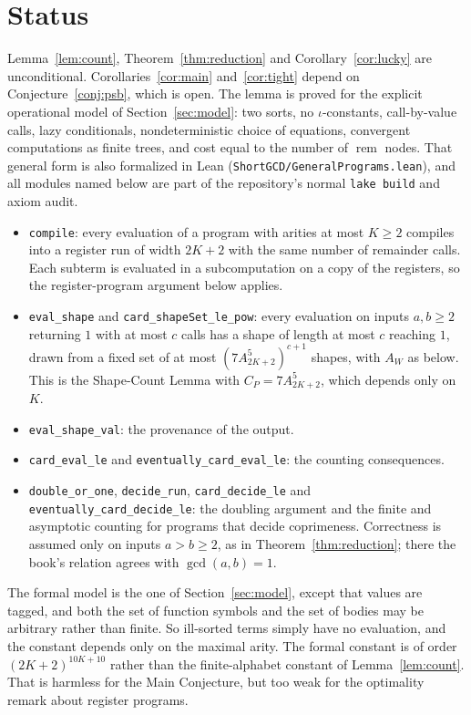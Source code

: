 \documentclass[11pt]{article}
\theoremstyle{remark}
\newcommand{\rem}{\operatorname{rem}}
\begin{document}
\section{Status}
Lemma~\ref{lem:count}, Theorem~\ref{thm:reduction} and
Corollary~\ref{cor:lucky} are unconditional. Corollaries~\ref{cor:main}
and~\ref{cor:tight} depend on Conjecture~\ref{conj:psb}, which is open.
The lemma is proved for the explicit operational model of
Section~\ref{sec:model}: two sorts, no $\iota$-constants, call-by-value calls,
lazy conditionals, nondeterministic choice of equations, convergent
computations as finite trees, and cost equal to the number of $\rem$ nodes.
That general form is also formalized in Lean
(\texttt{ShortGCD/GeneralPrograms.lean}), and all modules named below are part
of the repository's normal \texttt{lake build} and axiom audit.
\begin{itemize}
\item \texttt{compile}: every evaluation of a program with arities at most
$K\geq2$ compiles into a register run of width $2K+2$ with the same number of
remainder calls. Each subterm is evaluated in a subcomputation on a copy of
the registers, so the register-program argument below applies.
\item \texttt{eval\_shape} and \texttt{card\_shapeSet\_le\_pow}: every
evaluation on inputs $a,b\geq2$ returning $1$ with at most $c$ calls has a
shape of length at most $c$ reaching $1$, drawn from a fixed set of at most
$(7A_{2K+2}^5)^{c+1}$ shapes, with $A_W$ as below. This is the Shape-Count
Lemma with $C_P=7A_{2K+2}^5$, which depends only on $K$.
\item \texttt{eval\_shape\_val}: the provenance of the output.
\item \texttt{card\_eval\_le} and \texttt{eventually\_card\_eval\_le}: the
counting consequences.
\item \texttt{double\_or\_one}, \texttt{decide\_run},
\texttt{card\_decide\_le} and \texttt{eventually\_card\_decide\_le}: the
doubling argument and the finite and asymptotic counting for programs that
decide coprimeness. Correctness is assumed only on inputs $a>b\geq2$, as in
Theorem~\ref{thm:reduction}; there the book's relation agrees with
$\gcd(a,b)=1$.
\end{itemize}
The formal model is the one of Section~\ref{sec:model}, except that values are
tagged, and both the set of function symbols and the set of bodies may be
arbitrary rather than finite. So ill-sorted terms simply have no evaluation,
and the constant depends only on the maximal arity. The formal constant is of
order $(2K+2)^{10K+10}$ rather than the finite-alphabet constant of
Lemma~\ref{lem:count}. That is harmless for the Main Conjecture, but too weak
for the optimality remark about register programs.
\end{document}

